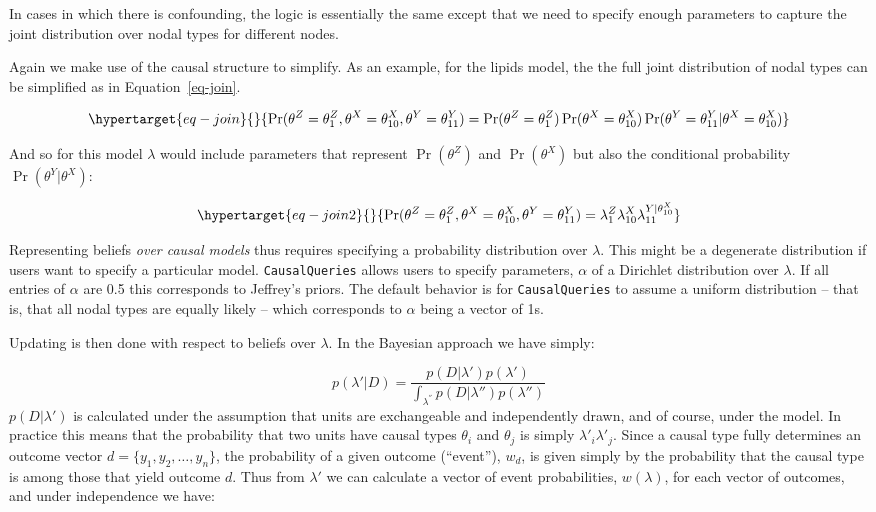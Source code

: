 \documentclass[
  11pt,
  article]{jss}
\begin{document}
In cases in which there is confounding, the logic is essentially the
same except that we need to specify enough parameters to capture the
joint distribution over nodal types for different nodes.

Again we make use of the causal structure to simplify. As an example,
for the lipids model, the the full joint distribution of nodal types can
be simplified as in Equation~\ref{eq-join}.

\begin{equation}\protect\hypertarget{eq-join}{}{
\Pr(\theta^Z = \theta^Z_1, \theta^X = \theta^X_{10}, \theta^Y = \theta^Y_{11}) = 
\Pr(\theta^Z = \theta^Z_1)\Pr(\theta^X = \theta^X_{10})\Pr(\theta^Y = \theta^Y_{11}|\theta^X = \theta^X_{10})
}\label{eq-join}\end{equation}

And so for this model \(\lambda\) would include parameters that
represent \(\Pr(\theta^Z)\) and \(\Pr(\theta^X)\) but also the
conditional probability \(\Pr(\theta^Y|\theta^X)\):

\begin{equation}\protect\hypertarget{eq-join2}{}{
\Pr(\theta^Z = \theta^Z_1, \theta^X = \theta^X_{10}, \theta^Y = \theta^Y_{11}) = 
\lambda^Z_1\lambda^X_{10}\lambda^{Y|\theta^X_{10}}_{11}
}\label{eq-join2}\end{equation}

Representing beliefs \emph{over causal models} thus requires specifying
a probability distribution over \(\lambda\). This might be a degenerate
distribution if users want to specify a particular model.
\texttt{CausalQueries} allows users to specify parameters, \(\alpha\) of
a Dirichlet distribution over \(\lambda\). If all entries of \(\alpha\)
are 0.5 this corresponds to Jeffrey's priors. The default behavior is
for \texttt{CausalQueries} to assume a uniform distribution -- that is,
that all nodal types are equally likely -- which corresponds to
\(\alpha\) being a vector of 1s.

Updating is then done with respect to beliefs over \(\lambda\). In the
Bayesian approach we have simply:

\[p(\lambda'|D) = \frac{p(D|\lambda')p(\lambda')}{\int_{\lambda^{''}} p(D|\lambda'')p(\lambda'')}\]
\(p(D|\lambda')\) is calculated under the assumption that units are
exchangeable and independently drawn, and of course, under the model. In
practice this means that the probability that two units have causal
types \(\theta_i\) and \(\theta_j\) is simply \(\lambda'_i\lambda'_j\).
Since a causal type fully determines an outcome vector
\(d = \{y_1, y_2,\dots,y_n\}\), the probability of a given outcome
(``event''), \(w_d\), is given simply by the probability that the causal
type is among those that yield outcome \(d\). Thus from \(\lambda'\) we
can calculate a vector of event probabilities, \(w(\lambda)\), for each
vector of outcomes, and under independence we have:
\end{document}
